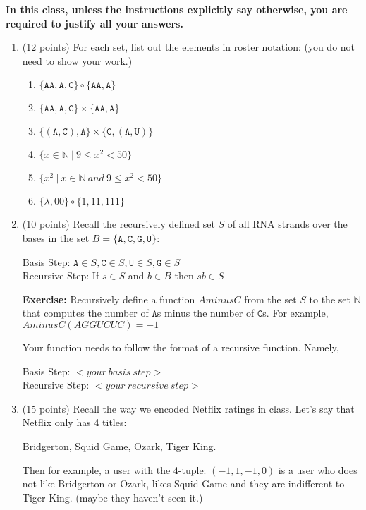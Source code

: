 \documentclass[10pt,letterpaper,unboxed,cm]{article}
\newcommand{\A}[0]{\texttt{A}}
\newcommand{\C}[0]{\texttt{C}}
\newcommand{\G}[0]{\texttt{G}}
\newcommand{\U}[0]{\texttt{U}}
\begin{document}
\textbf{In this class, unless the instructions explicitly say otherwise, you are required to justify all your answers.}

 
\begin{enumerate}
\item (12 points)
For each set, list out the elements in roster notation: (you do not need to show your work.)
\begin{enumerate}
\item
$\{\A\A,\A,\C\}\circ\{\A\A,\A\}$
\item
$\{\A\A,\A,\C\}\times\{\A\A,\A\}$
\item
$\{(\A,\C),\A\}\times\{\C,(\A,\U)\}$
\item
$\{x\in \mathbb{N}~|~9 \leq x^2< 50\}$
\item
$\{x^2~|~x\in \mathbb{N} ~and~ 9\leq x^2<50\}$
\item
$\{\lambda,00\}\circ\{1,11,111\}$
\end{enumerate}

\item (10 points)
Recall the recursively defined set $S$ of all RNA strands over the bases in the set $B=\{\A,\C,\G,\U\}$:

\begin{center}
Basis Step:    $\A\in S, \C\in S, \U\in S, \G\in S$\\
Recursive Step: If $s\in S$ and $b\in B$ then $sb\in S$
\end{center}

{\bf Exercise:} Recursively define a function $AminusC$ from the set $S$ to the set $\mathbb{N}$ that computes the number of $\A$s minus the number of $\C$s.  For example, $AminusC(AGGUCUC)=-1$

Your function needs to follow the format of a recursive function.  Namely,
\begin{center}
Basis Step:    $<your \ basis \ step>$\\
Recursive Step: $<your \ recursive \ step>$
\end{center}


\item (15 points)
Recall the way we encoded Netflix ratings in class. Let's say that Netflix only has 4 titles:
\begin{center}
 Bridgerton, Squid Game, Ozark, Tiger King.
\end{center}
Then for example, a user with the 4-tuple: $(-1,1,-1,0)$ is a user who does not like Bridgerton or Ozark, likes Squid Game and they are indifferent to Tiger King. (maybe they haven't seen it.)


\end{enumerate}
\end{document}
